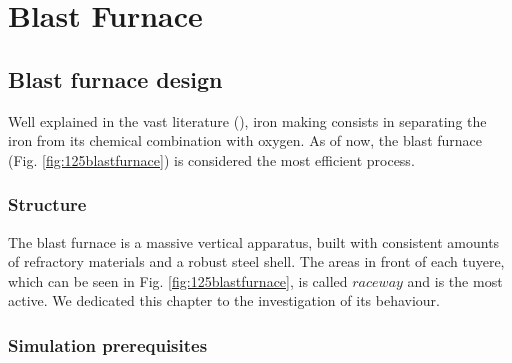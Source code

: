 
\chapter{Blast Furnace}
\label{cap:blastfurnace}

\section{Blast furnace design}
\label{sec:bfdesign}

Well explained in the vast literature (\cite{RefWorks:203}), 
iron making consists in separating the iron from its chemical combination with
oxygen. 
As of now, the blast furnace (Fig. \ref{fig:125blastfurnace}) is considered the
most efficient process.



\subsection{Structure}
\label{subsec:bfstructure}

The blast furnace is a massive vertical apparatus, built with consistent amounts
of refractory materials and a robust steel shell.
The areas in front of each tuyere, which can be seen in Fig.
\ref{fig:125blastfurnace}, is called $raceway$ and is the most active. 
We dedicated this chapter to the investigation of its behaviour.

\subsection{Simulation prerequisites}
\label{subsec:simulationprerequisites}

